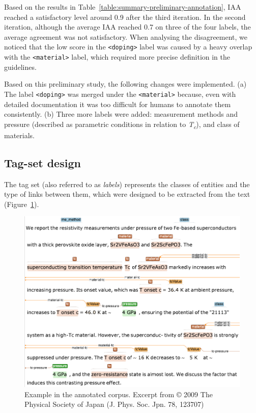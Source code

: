 Based on the results in Table~\ref{table:summary-preliminary-annotation}, IAA reached a satisfactory level around 0.9 after the third iteration. 
In the second iteration, although the average IAA reached 0.7 on three of the four labels, the average agreement was not satisfactory. 
When analysing the disagreement, we noticed that the low score in the \texttt{<doping>} label was caused by a heavy overlap with the \texttt{<material>} label, which required more precise definition in the guidelines. 

Based on this preliminary study, the following changes were implemented. 
(a) The label \texttt{<doping>} was merged under the \texttt{<material>} because, even with detailed documentation it was too difficult for humans to annotate them consistently.
(b) Three more labels were added: measurement methods and pressure (described as parametric conditions in relation to \textit{T\textsubscript{c}}), and class of materials. 

\subsection{Tag-set design}
The tag set (also referred to as \textit{labels}) represents the classes of entities and the type of links between them, which were designed to be extracted from the text (Figure~\ref{fig:example-annotations-and-links}).

\begin{figure}[ht]
  \centering
  \includegraphics[width=\linewidth]{figures/supermat/Fig1.png}
  \caption{Example in the annotated corpus. Excerpt from © 2009 The Physical Society of Japan (J. Phys. Soc. Jpn. 78, 123707)}
  \label{fig:example-annotations-and-links}
\end{figure}


